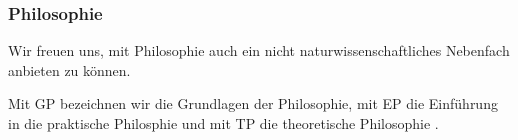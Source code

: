 \subsubsection{Philosophie}
Wir freuen uns, mit Philosophie auch ein nicht
naturwissenschaftliches Nebenfach anbieten zu können.

\begin{center}
\end{center}
Mit GP bezeichnen wir die \glqq Grundlagen der Philosophie\grqq ,
mit EP die \glqq Einführung in die praktische Philosphie\grqq
und mit TP die \glqq theoretische Philosophie \grqq.

